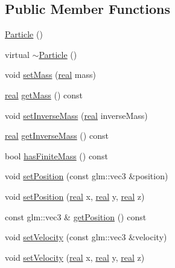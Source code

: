 \subsection*{Public Member Functions}
\begin{DoxyCompactItemize}
\item 
\mbox{\hyperlink{classrum_1_1_particle_a9ae5ce0fc18a8be75950b336b92ecd75}{Particle}} ()
\item 
virtual \mbox{\hyperlink{classrum_1_1_particle_abc143197fe05fa60a1a3ccbf7b5f0fe8}{$\sim$\+Particle}} ()
\item 
void \mbox{\hyperlink{classrum_1_1_particle_adc0d0457bf81cc25fd4dbaf6cf8546b1}{set\+Mass}} (\mbox{\hyperlink{namespacerum_a7e8cca23573d5eaead0f138cbaa4862c}{real}} mass)
\item 
\mbox{\hyperlink{namespacerum_a7e8cca23573d5eaead0f138cbaa4862c}{real}} \mbox{\hyperlink{classrum_1_1_particle_a847e15162df481db80c107cacf3198e1}{get\+Mass}} () const
\item 
void \mbox{\hyperlink{classrum_1_1_particle_a88699b6cd5b37767e0586d4d5a0162fa}{set\+Inverse\+Mass}} (\mbox{\hyperlink{namespacerum_a7e8cca23573d5eaead0f138cbaa4862c}{real}} inverse\+Mass)
\item 
\mbox{\hyperlink{namespacerum_a7e8cca23573d5eaead0f138cbaa4862c}{real}} \mbox{\hyperlink{classrum_1_1_particle_a2a2fa7e2d8c037ac73871f12ea7d6fa3}{get\+Inverse\+Mass}} () const
\item 
bool \mbox{\hyperlink{classrum_1_1_particle_a83071b132ef0961b63d05c68dd8ffb51}{has\+Finite\+Mass}} () const
\item 
void \mbox{\hyperlink{classrum_1_1_particle_a378c98f478f2112c3fb6630b07b4aee5}{set\+Position}} (const glm\+::vec3 \&position)
\item 
void \mbox{\hyperlink{classrum_1_1_particle_a1e3845cefe5fa7464150809b06161ca2}{set\+Position}} (\mbox{\hyperlink{namespacerum_a7e8cca23573d5eaead0f138cbaa4862c}{real}} x, \mbox{\hyperlink{namespacerum_a7e8cca23573d5eaead0f138cbaa4862c}{real}} y, \mbox{\hyperlink{namespacerum_a7e8cca23573d5eaead0f138cbaa4862c}{real}} z)
\item 
const glm\+::vec3 \& \mbox{\hyperlink{classrum_1_1_particle_a4741a2cda53c710c6243f615285ad083}{get\+Position}} () const
\item 
void \mbox{\hyperlink{classrum_1_1_particle_ab521aa9c870bbc63d72ebfef51561cb4}{set\+Velocity}} (const glm\+::vec3 \&velocity)
\item 
void \mbox{\hyperlink{classrum_1_1_particle_ab32f21d9858f009239ac37190f2ee732}{set\+Velocity}} (\mbox{\hyperlink{namespacerum_a7e8cca23573d5eaead0f138cbaa4862c}{real}} x, \mbox{\hyperlink{namespacerum_a7e8cca23573d5eaead0f138cbaa4862c}{real}} y, \mbox{\hyperlink{namespacerum_a7e8cca23573d5eaead0f138cbaa4862c}{real}} z)

\end{DoxyCompactItemize}
